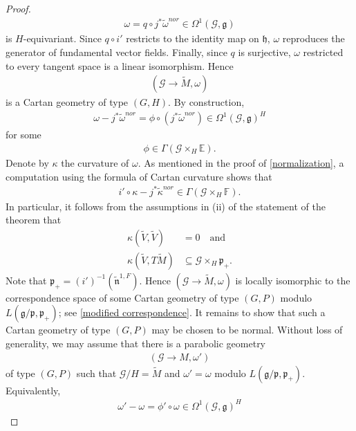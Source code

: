 \documentclass[11pt]{amsart}
\begin{document}
\begin{proof}
\begin{align*}
    \omega=q\circ j^*\tilde\omega^{nor}\in\Omega^1(\mathcal G,\mathfrak g)
\end{align*}
is $H$-equivariant. Since $q\circ i'$ restricts to the identity map on $\mathfrak h$, $\omega$ reproduces the generator of fundamental vector fields. Finally, since $q$ is surjective, $\omega$ restricted to every tangent space is a linear isomorphism. Hence 
\begin{align}\label{converse direction first intermediate Cartan geometry}
(\mathcal G\to \tilde M,\omega)
\end{align}
is a Cartan geometry of type $(G,H)$. By construction,
\begin{align*}
    \omega-j^*\tilde\omega^{nor}=\phi\circ(j^*\tilde\omega^{nor})\in\Omega^1(\mathcal G,\mathfrak g)^H
\end{align*}
for some
\begin{align*}
    \phi\in\Gamma(\mathcal G\times_H\mathbb E).
\end{align*}
Denote by $\kappa$ the curvature of $\omega$. As mentioned in the proof of \cref{normalization}, a computation using the formula of Cartan curvature shows that
\begin{align*}
    i'\circ\kappa-j^*\tilde\kappa^{nor}\in\Gamma(\mathcal G\times_H\mathbb F).
\end{align*}
In particular, it follows from the assumptions in (ii) of the statement of the theorem that
\begin{align*}
    \kappa(\tilde V,\tilde V)&=0\quad\text{and}\\
    \kappa(\tilde V,T\tilde M)&\subseteq\mathcal G\times_H\mathfrak p_+.
\end{align*}
Note that $\mathfrak p_+=(i')^{-1}(\tilde{\mathfrak n}^{1,F})$.
Hence $(\mathcal G\to\tilde M,\omega)$ is locally isomorphic to the correspondence space of some Cartan geometry of type $(G,P)$ modulo $L(\mathfrak g/\mathfrak p,\mathfrak p_+)$; see \cref{modified correspondence}. It remains to show that such a Cartan geometry of type $(G,P)$ may be chosen to be normal. Without loss of generality, we may assume that there is a parabolic geometry
\begin{align*}
    (\mathcal G\to M,\omega')
\end{align*}
of type $(G,P)$ such that $\mathcal G/H=\tilde M$ and $\omega'=\omega$ modulo $L(\mathfrak g/\mathfrak p,\mathfrak p_+)$. Equivalently,
\begin{align*}
    \omega'-\omega=\phi'\circ\omega\in\Omega^1(\mathcal G,\mathfrak g)^H

\end{align*}
\end{proof}
\end{document}
